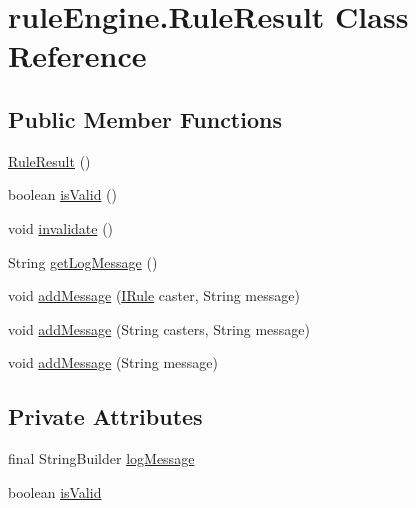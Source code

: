 \hypertarget{classrule_engine_1_1_rule_result}{}\section{rule\+Engine.\+Rule\+Result Class Reference}
\label{classrule_engine_1_1_rule_result}
\subsection*{Public Member Functions}
\begin{DoxyCompactItemize}
\item 
\mbox{\hyperlink{classrule_engine_1_1_rule_result_a3f965dc55a0b913c1da1c8c567fa1814}{Rule\+Result}} ()
\item 
boolean \mbox{\hyperlink{classrule_engine_1_1_rule_result_a2cbcc84268db20bd941e6ff3ee648e6e}{is\+Valid}} ()
\item 
void \mbox{\hyperlink{classrule_engine_1_1_rule_result_a3257a949d317dfb83ecc2b9cb17ab5fd}{invalidate}} ()
\item 
String \mbox{\hyperlink{classrule_engine_1_1_rule_result_a25680c11a9156d9052b04a1803f81e9f}{get\+Log\+Message}} ()
\item 
void \mbox{\hyperlink{classrule_engine_1_1_rule_result_a530d8dd9cb3461dba440b37e12347f5a}{add\+Message}} (\mbox{\hyperlink{interfacerule_engine_1_1rules_1_1new_rules_1_1_i_rule}{I\+Rule}} caster, String message)
\item 
void \mbox{\hyperlink{classrule_engine_1_1_rule_result_ac85ac250467bcd26915ef4032890037c}{add\+Message}} (String casters, String message)
\item 
void \mbox{\hyperlink{classrule_engine_1_1_rule_result_affbfff14b19dddc228fca219967e8d9c}{add\+Message}} (String message)
\end{DoxyCompactItemize}
\subsection*{Private Attributes}
\begin{DoxyCompactItemize}
\item 
final String\+Builder \mbox{\hyperlink{classrule_engine_1_1_rule_result_a7c7395f0f44aa49e768b27ba45f02517}{log\+Message}}
\item 
boolean \mbox{\hyperlink{classrule_engine_1_1_rule_result_a5120de6696460ca5ca0754303dbbc9d8}{is\+Valid}}
\end{DoxyCompactItemize}


